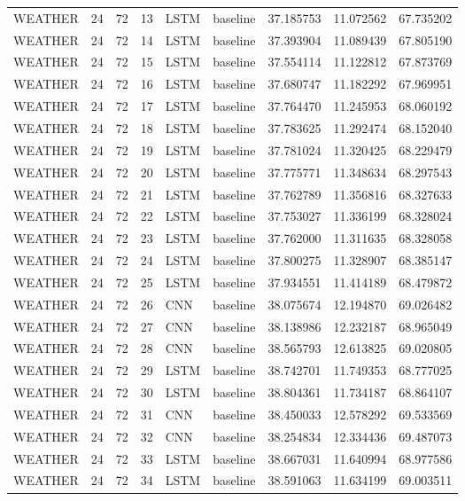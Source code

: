 \begin{table}
\begin{tabular}{lrrrllrrr}
WEATHER & 24 & 72 & 13 & LSTM & baseline & 37.185753 & 11.072562 & 67.735202 \\
WEATHER & 24 & 72 & 14 & LSTM & baseline & 37.393904 & 11.089439 & 67.805190 \\
WEATHER & 24 & 72 & 15 & LSTM & baseline & 37.554114 & 11.122812 & 67.873769 \\
WEATHER & 24 & 72 & 16 & LSTM & baseline & 37.680747 & 11.182292 & 67.969951 \\
WEATHER & 24 & 72 & 17 & LSTM & baseline & 37.764470 & 11.245953 & 68.060192 \\
WEATHER & 24 & 72 & 18 & LSTM & baseline & 37.783625 & 11.292474 & 68.152040 \\
WEATHER & 24 & 72 & 19 & LSTM & baseline & 37.781024 & 11.320425 & 68.229479 \\
WEATHER & 24 & 72 & 20 & LSTM & baseline & 37.775771 & 11.348634 & 68.297543 \\
WEATHER & 24 & 72 & 21 & LSTM & baseline & 37.762789 & 11.356816 & 68.327633 \\
WEATHER & 24 & 72 & 22 & LSTM & baseline & 37.753027 & 11.336199 & 68.328024 \\
WEATHER & 24 & 72 & 23 & LSTM & baseline & 37.762000 & 11.311635 & 68.328058 \\
WEATHER & 24 & 72 & 24 & LSTM & baseline & 37.800275 & 11.328907 & 68.385147 \\
WEATHER & 24 & 72 & 25 & LSTM & baseline & 37.934551 & 11.414189 & 68.479872 \\
WEATHER & 24 & 72 & 26 & CNN & baseline & 38.075674 & 12.194870 & 69.026482 \\
WEATHER & 24 & 72 & 27 & CNN & baseline & 38.138986 & 12.232187 & 68.965049 \\
WEATHER & 24 & 72 & 28 & CNN & baseline & 38.565793 & 12.613825 & 69.020805 \\
WEATHER & 24 & 72 & 29 & LSTM & baseline & 38.742701 & 11.749353 & 68.777025 \\
WEATHER & 24 & 72 & 30 & LSTM & baseline & 38.804361 & 11.734187 & 68.864107 \\
WEATHER & 24 & 72 & 31 & CNN & baseline & 38.450033 & 12.578292 & 69.533569 \\
WEATHER & 24 & 72 & 32 & CNN & baseline & 38.254834 & 12.334436 & 69.487073 \\
WEATHER & 24 & 72 & 33 & LSTM & baseline & 38.667031 & 11.640994 & 68.977586 \\
WEATHER & 24 & 72 & 34 & LSTM & baseline & 38.591063 & 11.634199 & 69.003511 \\

\end{tabular}
\end{table}
